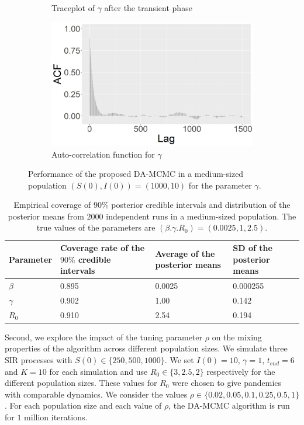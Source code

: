 \documentclass[11pt]{article}
\begin{document}
\begin{figure}
\begin{subfigure}[b]{0.41\textwidth}
			\caption{Traceplot of $\gamma$ after the transient phase}
			\label{fig:E1_burn_gamma_tp}
		\end{subfigure}
		\hfill
		\begin{subfigure}[b]{0.41\textwidth}
			\centering
			\includegraphics[width=\textwidth]{E1_burn_gamma_acf}
			\caption{Auto-correlation function for $\gamma$}
			\label{fig:E1_burn_gamma_acf}
		\end{subfigure}
		\caption{Performance of the proposed DA-MCMC in a medium-sized population $(S(0), I(0)) = (1000, 10)$ for the parameter $\gamma$.}
		\label{fig:E1}
	\end{figure}
	
    \begin{table}
    \centering
    \begin{tabular}{ |C{2cm}| *{3}{C{3cm}}|}
        \hline
        Parameter & Coverage rate of the $90\%$ credible intervals & Average of the posterior means & SD of the posterior means \\ 
        \hline
        $\beta$ & 0.895 & 0.0025 & 0.000255\\ 
        $\gamma$ & 0.902 & 1.00 & 0.142 \\ 
        $R_0$ & 0.910 & 2.54 & 0.194 \\
        \hline
    \end{tabular}
    \caption{Empirical coverage of  $90\%$ posterior credible intervals and distribution of the posterior means from $2000$ independent runs in a medium-sized population. The true values of the parameters are $(\beta. \gamma. R_0) = (0.0025, 1, 2.5)$.}
    \label{tab:coverage}
    \end{table}
	
	Second, we explore the impact of the tuning parameter $\rho$ on the mixing properties of the algorithm across different population sizes.
	We simulate three SIR processes with $S(0) \in \{250, 500, 1000\}$. We set $I(0)=10$, $\gamma=1$, $t_{end} = 6$ and $K = 10$ for each simulation and use $R_0 \in \{3, 2.5, 2\}$ respectively for the different population sizes. These values for $R_0$ were chosen to give pandemics with comparable dynamics. We consider the values $\rho \in \{0.02, 0.05, 0.1, 0.25, 0.5, 1\}$. For each population size and each value of $\rho$, the DA-MCMC algorithm is run for $1$ million iterations. %
	
\end{document}
